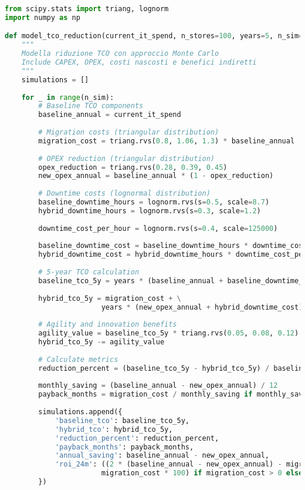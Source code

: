 \begin{lstlisting}[language=Python, caption=Analisi TCO con Incertezza Parametrica]
from scipy.stats import triang, lognorm
import numpy as np

def model_tco_reduction(current_it_spend, n_stores=100, years=5, n_sim=10000):
    """
    Modella riduzione TCO con approccio Monte Carlo
    Include CAPEX, OPEX, costi nascosti e benefici indiretti
    """
    simulations = []
    
    for _ in range(n_sim):
        # Baseline TCO components
        baseline_annual = current_it_spend
        
        # Migration costs (triangular distribution)
        migration_cost = triang.rvs(0.8, 1.06, 1.3) * baseline_annual
        
        # OPEX reduction (triangular distribution)
        opex_reduction = triang.rvs(0.28, 0.39, 0.45)
        new_opex_annual = baseline_annual * (1 - opex_reduction)
        
        # Downtime costs (lognormal distribution)
        baseline_downtime_hours = lognorm.rvs(s=0.5, scale=8.7)
        hybrid_downtime_hours = lognorm.rvs(s=0.3, scale=1.2)
        
        downtime_cost_per_hour = lognorm.rvs(s=0.4, scale=125000)
        
        baseline_downtime_cost = baseline_downtime_hours * downtime_cost_per_hour
        hybrid_downtime_cost = hybrid_downtime_hours * downtime_cost_per_hour
        
        # 5-year TCO calculation
        baseline_tco_5y = years * (baseline_annual + baseline_downtime_cost)
        
        hybrid_tco_5y = migration_cost + \
                       years * (new_opex_annual + hybrid_downtime_cost)
        
        # Agility and innovation benefits
        agility_value = baseline_tco_5y * triang.rvs(0.05, 0.08, 0.12)
        hybrid_tco_5y -= agility_value
        
        # Calculate metrics
        reduction_percent = (baseline_tco_5y - hybrid_tco_5y) / baseline_tco_5y * 100
        
        monthly_saving = (baseline_annual - new_opex_annual) / 12
        payback_months = migration_cost / monthly_saving if monthly_saving > 0 else np.inf
        
        simulations.append({
            'baseline_tco': baseline_tco_5y,
            'hybrid_tco': hybrid_tco_5y,
            'reduction_percent': reduction_percent,
            'payback_months': payback_months,
            'annual_saving': baseline_annual - new_opex_annual,
            'roi_24m': ((2 * (baseline_annual - new_opex_annual) - migration_cost) / 
                       migration_cost * 100) if migration_cost > 0 else 0
        })
    

\end{lstlisting}
